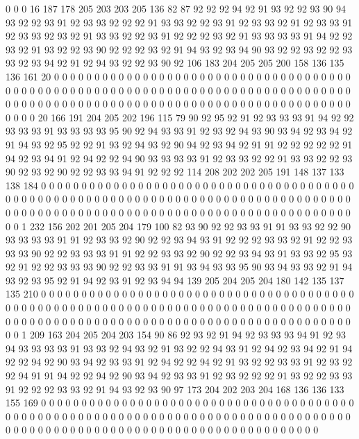 0 0 0 16 187 178 205 203 203 205 136 82 87 92 92 92 94 92 91 93
92 92 93 90 94 93 92 92 93 91 92 93 93 92 92 92 91 93 93 92
92 93 91 92 93 93 92 91 92 93 93 91 92 93 93 92 93 92 91 93
93 92 92 93 91 92 92 92 93 92 91 93 93 93 93 91 94 92 92 93
92 91 93 92 92 93 90 92 92 92 93 92 91 94 93 92 93 94 90 93
92 92 93 92 92 93 93 92 93 94 92 91 92 94 93 92 92 93 90 92
106 183 204 205 205 200 158 136 135 136 161 20 0 0 0 0 0 0 0 0
0 0 0 0 0 0 0 0 0 0 0 0 0 0 0 0 0 0 0 0
0 0 0 0 0 0 0 0 0 0 0 0 0 0 0 0 0 0 0 0
0 0 0 0 0 0 0 0 0 0 0 0 0 0 0 0 0 0 0 0
0 0 0 0 0 0 0 0 0 0 0 0 0 0 0 0 0 0 0 0
0 0 0 0 0 0 0 0 0 0 0 0 0 0 0 0 0 0 0 0
0 0 0 0 0 0 0 0 0 0 0 0 0 0 0 0 0 0 0 20
166 191 204 205 202 196 115 79 90 92 95 92 91 92 93 93 93 91 94 92
92 93 93 93 91 93 93 93 93 95 90 92 94 93 93 91 92 93 92 94
93 90 93 94 92 93 94 92 91 94 93 92 95 92 92 91 93 92 94 93
92 90 94 92 93 94 92 91 91 92 92 92 92 92 91 94 92 93 94 91
92 94 92 92 94 90 93 93 93 93 91 92 93 93 92 92 91 93 93 92
92 93 90 92 93 92 90 92 92 93 93 94 91 92 92 92 114 208 202 202
205 191 148 137 133 138 184 0 0 0 0 0 0 0 0 0 0 0 0 0
0 0 0 0 0 0 0 0 0 0 0 0 0 0 0 0 0 0 0 0
0 0 0 0 0 0 0 0 0 0 0 0 0 0 0 0 0 0 0 0
0 0 0 0 0 0 0 0 0 0 0 0 0 0 0 0 0 0 0 0
0 0 0 0 0 0 0 0 0 0 0 0 0 0 0 0 0 0 0 0
0 0 0 0 0 0 0 0 0 0 0 0 0 0 0 0 0 0 0 0
0 0 0 0 0 0 0 0 0 0 0 0 0 0 1 232 156 202 201 205
204 179 100 82 93 90 92 92 93 93 91 91 93 93 92 92 90 93 93 93
93 91 91 92 93 93 92 90 92 92 93 94 93 91 92 92 92 93 93 92
91 92 92 93 93 93 90 92 92 93 93 93 91 91 92 92 93 93 92 90
92 92 93 94 93 91 93 93 92 95 93 92 91 92 92 93 93 93 90 92
92 93 93 91 91 93 94 93 93 95 90 93 94 93 93 92 91 94 93 92
93 95 92 91 94 92 93 91 92 93 94 94 139 205 204 205 204 180 142 135
137 135 210 0 0 0 0 0 0 0 0 0 0 0 0 0 0 0 0 0
0 0 0 0 0 0 0 0 0 0 0 0 0 0 0 0 0 0 0 0
0 0 0 0 0 0 0 0 0 0 0 0 0 0 0 0 0 0 0 0
0 0 0 0 0 0 0 0 0 0 0 0 0 0 0 0 0 0 0 0
0 0 0 0 0 0 0 0 0 0 0 0 0 0 0 0 0 0 0 0
0 0 0 0 0 0 0 0 0 0 0 0 0 0 0 0 0 0 0 0
0 0 0 0 0 0 0 0 0 0 1 209 163 204 205 204 203 154 90 86
92 93 92 91 94 92 93 93 93 94 91 92 93 94 93 93 93 93 91 93
93 92 94 93 92 91 93 92 92 94 93 91 92 94 92 93 94 92 91 94
92 92 94 92 90 93 94 92 93 93 91 92 94 92 92 94 92 91 93 92
92 93 93 91 92 93 92 92 94 91 91 94 92 92 94 92 90 93 94 92
93 93 91 92 93 92 92 92 91 93 92 92 93 93 91 92 92 92 93 93
92 91 94 93 92 93 90 97 173 204 202 203 204 168 136 136 133 155 169 0
0 0 0 0 0 0 0 0 0 0 0 0 0 0 0 0 0 0 0 0
0 0 0 0 0 0 0 0 0 0 0 0 0 0 0 0 0 0 0 0
0 0 0 0 0 0 0 0 0 0 0 0 0 0 0 0 0 0 0 0
0 0 0 0 0 0 0 0 0 0 0 0 0 0 0 0 0 0 0 0
0 0 0 0 0 0 0 0 0 0 0 0 0 0 0 0 0 0 0 0
0 0 0 0 0 0 0 0 0 0 0 0 0 0 0 0 0 0 0 0
